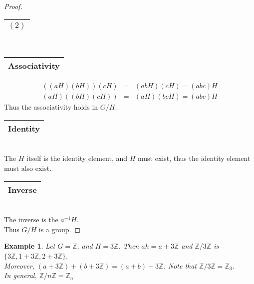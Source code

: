 \documentclass{article}
\theoremstyle{MyNonumberplain}
\theoremstyle{break}
\newtheorem*{proof}{Proof. }
\theoremstyle{break}
\newtheorem{example}{Example}[section]
\theoremstyle{break}
\theoremstyle{definition}
\theoremstyle{break}
\begin{document}
\begin{thmbox}
\begin{prfbox}
\begin{proof}
              \begin{tabular}{|c|}
                \hline
                $(2)$\\
                \hline
              \end{tabular}\\
              
              \begin{tabular}{|c|}
                \hline
                Associativity\\
                \hline
              \end{tabular}
              \begin{eqnarray*}
                ((a H) (b H)) (c H) & = & (a b H) (c H) = (a b c) H\\
                (a H) ((b H) (c H)) & = & (a H) (b c H) = (a b c) H
              \end{eqnarray*}
              Thus the associativity holds in $G / H$.\\
              
              \begin{tabular}{|c|}
                \hline
                Identity\\
                \hline
              \end{tabular}\\
              
              The $H$ itself is the identity element, and $H$ must exist, thus the identity
              element must also exist.\\
              
              \begin{tabular}{|c|}
                \hline
                Inverse\\
                \hline
              \end{tabular}\\
              
              The inverse is the $a^{- 1} H$.\\
              
              Thus $G / H$ is a group. 
        \end{proof}
    \end{prfbox}

\end{thmbox}

\begin{expbox}
    \begin{example}
        Let $G =\mathbb{Z}$, and $H = 3\mathbb{Z}$. Then $a h = a + 3\mathbb{Z}$ and
        $\mathbb{Z}/ 3\mathbb{Z}$ is $\{ 3\mathbb{Z}, 1 + 3\mathbb{Z}, 2 + 3\mathbb{Z}
        \}$.\\

        Moreover, $(a + 3\mathbb{Z}) + (b + 3\mathbb{Z}) = (a + b) + 3\mathbb{Z}$.
        Note that $\mathbb{Z}/ 3\mathbb{Z}=\mathbb{Z}_3$.\\

        In general, $\mathbb{Z}/ n\mathbb{Z}=\mathbb{Z}_n$

    \end{example}
\end{expbox}
\end{document}
